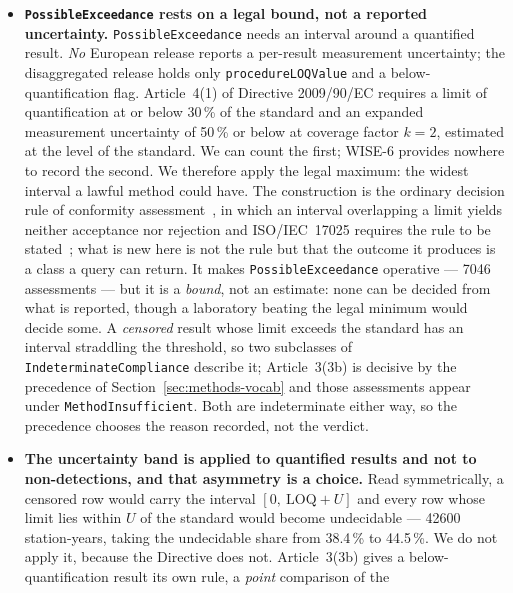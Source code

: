 \begin{itemize}
    A sum standard is not a limit on any of its members, so those rows are
    reported as not individually assessable rather than assessed.
  \item \textbf{\texttt{PossibleExceedance} rests on a legal bound, not a
    reported uncertainty.} \texttt{PossibleExceedance} needs an interval around a
    quantified result. \emph{No} European release reports a per-result measurement
    uncertainty; the disaggregated release holds only
    \texttt{procedureLOQValue} and a below-quantification flag. Article~4(1) of
    Directive 2009/90/EC requires a limit of quantification at or below
    \num{30}\,\% of the standard and an expanded measurement uncertainty of
    \num{50}\,\% or below at coverage factor $k=2$, estimated at the level of
    the standard. We can count the first; WISE-6 provides nowhere to record the
    second. We therefore apply the legal maximum: the widest interval a lawful
    method could have. The construction is the ordinary decision rule of
    conformity assessment~\cite{jcgm2012conformity,eurachem2021compliance},
    in which an interval overlapping a limit yields neither acceptance nor
    rejection and ISO/IEC~17025 requires the rule to be stated~\cite{iso17025};
    what is new here is not the rule but that the outcome it produces is a
    class a query can return. It makes \texttt{PossibleExceedance} operative ---
    \num{7046} assessments --- but it is a \emph{bound}, not an estimate: none
    can be decided from what is reported, though a laboratory beating the legal
    minimum would decide some. A \emph{censored} result whose limit exceeds the
    standard has an interval straddling the threshold, so two subclasses of
    \texttt{IndeterminateCompliance} describe it; Article~3(3b) is decisive by
    the precedence of Section~\ref{sec:methods-vocab} and those assessments
    appear under \texttt{MethodInsufficient}. Both are indeterminate either way,
    so the precedence chooses the reason recorded, not the verdict.
  \item \textbf{The uncertainty band is applied to quantified results and not
    to non-detections, and that asymmetry is a choice.} Read symmetrically, a
    censored row would carry the interval $[0,\ \mathrm{LOQ}+U]$ and every
    row whose limit lies within $U$ of the standard would become undecidable ---
    \num{42600} station-years, taking the undecidable share from
    \num{38.4}\,\% to \num{44.5}\,\%.
    We do not apply it, because the Directive does not. Article~3(3b) gives a
    below-quantification result its own rule, a \emph{point} comparison of the

\end{itemize}
